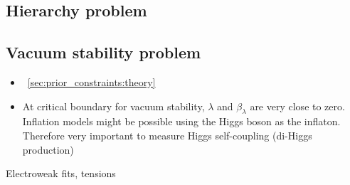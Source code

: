 
\subsection{Hierarchy problem}

\subsection{Vacuum stability problem}
\begin{itemize}
	\item \Section~\ref{sec:prior_constraints:theory}
	\item At critical boundary for vacuum stability, $\lambda$ and $\beta_{\lambda}$ are very close to zero. Inflation models might be possible using the Higgs boson as the inflaton. Therefore very important to measure Higgs self-coupling (\eg di-Higgs production)
\end{itemize}

Electroweak fits, tensions
